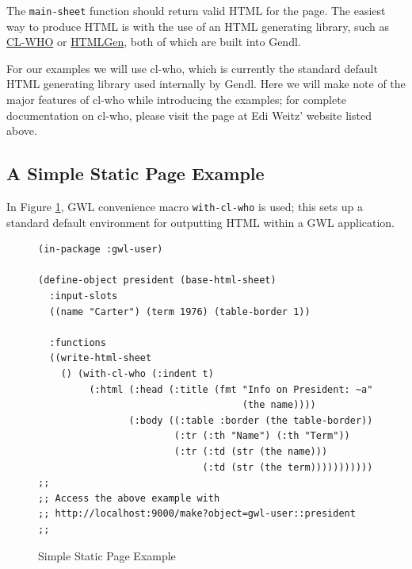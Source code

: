 \documentclass [11pt]{book}
\begin{document}
The \texttt{main-sheet} function should return valid
HTML for the page. The easiest way to produce HTML is with the use of
an HTML generating library, such as \href{http://weitz.de/cl-who}{CL-WHO} or \href{http://www.franz.com/support/documentation/current/doc/aserve/htmlgen.html}{HTMLGen}, both of which are built into Gendl.



For our examples we will use cl-who, which is currently the
standard default HTML generating library used internally by
Gendl. Here we will make note of the major features of cl-who while
introducing the examples; for complete documentation on cl-who, please
visit the page at Edi Weitz' website listed above.



\subsection{A Simple Static Page Example}

\label{subsec:asimplestaticpageexample}



In Figure 
\ref{fig:gwl-1}, GWL convenience macro \texttt{with-cl-who} is used; this sets up a standard default environment for outputting HTML 
within a GWL application.
\begin{figure}
\begin{lrbox}{\boxedverb}
\begin{minipage}{\linewidth}
\tiny{

\begin{verbatim}(in-package :gwl-user)

(define-object president (base-html-sheet)
  :input-slots
  ((name "Carter") (term 1976) (table-border 1))

  :functions
  ((write-html-sheet
    () (with-cl-who (:indent t)
         (:html (:head (:title (fmt "Info on President: ~a" 
                                    (the name))))
                (:body ((:table :border (the table-border))
                        (:tr (:th "Name") (:th "Term"))
                        (:tr (:td (str (the name))) 
                             (:td (str (the term)))))))))))
;;
;; Access the above example with 
;; http://localhost:9000/make?object=gwl-user::president
;;

\end{verbatim}}
\end{minipage}
\end{lrbox}
\fbox{\usebox{\boxedverb}}

\caption{Simple Static Page Example}

\label{fig:gwl-1}

\end{figure}
\end{document}
